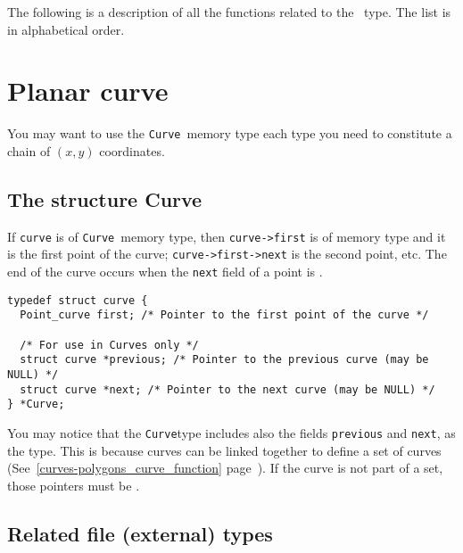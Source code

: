 The following is a description of all the functions related to 
the \point\ type. The list is in alphabetical order.

\newpage %



\section{Planar curve}


\label{curves-polygons_curve}
\def\curve{{\tt Curve}}
\index{structure!\curve}

You may want to use the \curve\ memory type each type you need to 
constitute a chain of $(x,y)$ coordinates.

\subsection{The structure Curve}
\label{curves-polygons_curve_structure}

If \verb+curve+ is of \curve\ memory type, then \verb+curve->first+ is
of \point memory type and it is the first point of the curve; 
\verb+curve->first->next+ is the second point, etc.
The end of the curve occurs when the \verb+next+ field of a point is
\Null.

{\small
\begin{verbatim}
typedef struct curve {
  Point_curve first; /* Pointer to the first point of the curve */

  /* For use in Curves only */
  struct curve *previous; /* Pointer to the previous curve (may be NULL) */
  struct curve *next; /* Pointer to the next curve (may be NULL) */
} *Curve;
\end{verbatim}
}

You may notice that the \curve type includes also the fields
\verb+previous+ and \verb+next+, as the \point type. This is because
curves can be linked together to define a set of curves (See~\ref{curves-polygons_curve_function} page~\pageref{curves-polygons_curve_function}).
If the curve is not part of a set, those pointers must be \Null.

\subsection{Related file (external) types}
\label{curves-polygons_curve-file_type}

